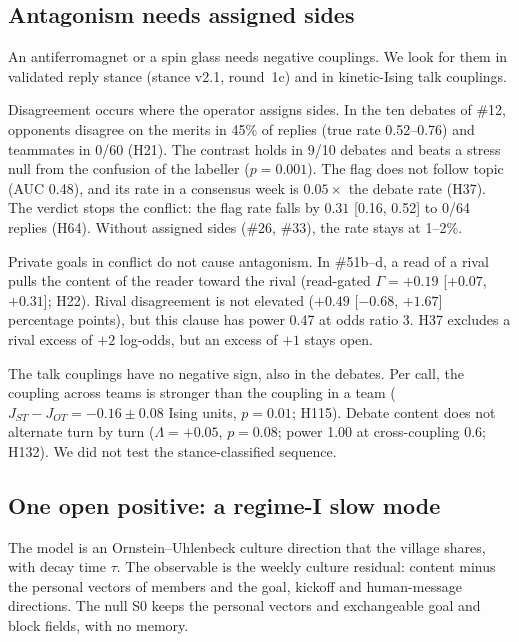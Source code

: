 \subsection{Antagonism needs assigned sides}
\label{sec:coll-antagonism}

An antiferromagnet or a spin glass needs negative couplings.
We look for them in validated reply stance (stance v2.1, round~1c) and in kinetic-Ising talk couplings.

Disagreement occurs where the operator assigns sides.
In the ten debates of \#12, opponents disagree on the merits in 45\% of replies (true rate 0.52--0.76) and teammates in 0/60 (H21).
The contrast holds in 9/10 debates and beats a stress null from the confusion of the labeller ($p=0.001$).
The flag does not follow topic (AUC 0.48), and its rate in a consensus week is $0.05\times$ the debate rate (H37).
The verdict stops the conflict: the flag rate falls by $0.31$ [0.16, 0.52] to 0/64 replies (H64).
Without assigned sides (\#26, \#33), the rate stays at 1--2\%.

Private goals in conflict do not cause antagonism.
In \#51b--d, a read of a rival pulls the content of the reader toward the rival (read-gated $\Gamma=+0.19$ [$+0.07$, $+0.31$]; H22).
Rival disagreement is not elevated ($+0.49$ [$-0.68$, $+1.67$] percentage points), but this clause has power 0.47 at odds ratio 3.
H37 excludes a rival excess of $+2$ log-odds, but an excess of $+1$ stays open.

The talk couplings have no negative sign, also in the debates.
Per call, the coupling across teams is stronger than the coupling in a team ($J_{ST}-J_{OT}=-0.16\pm0.08$ Ising units, $p=0.01$; H115).
Debate content does not alternate turn by turn ($\Lambda=+0.05$, $p=0.08$; power 1.00 at cross-coupling 0.6; H132).
We did not test the stance-classified sequence.

\subsection{One open positive: a regime-I slow mode}
\label{sec:coll-slowmode}

The model is an Ornstein--Uhlenbeck culture direction that the village shares, with decay time $\tau$.
The observable is the weekly culture residual: content minus the personal vectors of members and the goal, kickoff and human-message directions.
The null S0 keeps the personal vectors and exchangeable goal and block fields, with no memory.

